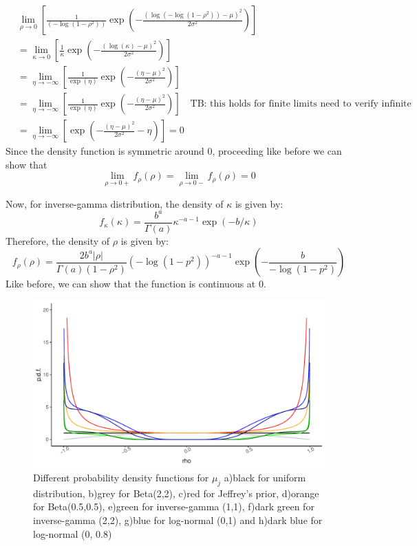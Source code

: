 \documentclass{amsart}
\begin{document}
\begin{align}
	&\lim_{\rho\to 0}\left[\frac{1}{(-\log(1-\rho^2))} 
	\exp\left(-\frac{(\log(-\log(1-\rho^2))-\mu)^2}{2\sigma^2}\right)\right]\\
	& = \lim_{\kappa\to 0}\left[\frac{1}{\kappa} 
	\exp\left(-\frac{(\log(\kappa)-\mu)^2}{2\sigma^2}\right)\right]\\
	& = \lim_{\eta\to -\infty}\left[\frac{1}{\exp(\eta)} 
	\exp\left(-\frac{(\eta-\mu)^2}{2\sigma^2}\right)\right]\\
	& = \lim_{\eta\to -\infty}\left[\frac{1}{\exp(\eta)} 
	\exp\left(-\frac{(\eta-\mu)^2}{2\sigma^2}\right)\right]\quad \text{TB: this holds for finite limits need to verify infinite}\\
	& = \lim_{\eta\to -\infty}\left[ 
	\exp\left(-\frac{(\eta-\mu)^2}{2\sigma^2}-\eta\right)\right] = 0
\end{align}
Since the density function is symmetric around 0, proceeding like before we can show that
\begin{equation}
	\lim_{\rho\to 0+}f_{\rho}(\rho) = \lim_{\rho\to 0-}f_{\rho}(\rho) = 0
\end{equation}

Now, for inverse-gamma distribution, the density of $\kappa$ is given by:
\begin{equation}
	f_{\kappa}(\kappa)= \frac{b^{a}}{\Gamma(a)}
	\kappa^{-a-1}\exp(-b/\kappa)
\end{equation}
Therefore, the density of $\rho$ is given by:
\begin{equation}
	f_{\rho}(\rho) = \frac{2b^{a}|\rho|}{\Gamma(a)(1-\rho^2)}
	(-\log(1-p^2))^{-a-1}\exp\left(-\frac{b}{-\log(1-p^2)}\right)
\end{equation}
Like before, we can show that the function is continuous at 0.

\begin{figure}[ht]
	\centering
	\includegraphics[width=0.85\linewidth]{prior_comparison.pdf}
	\caption{Different probability density functions for $\mu_j$ a)black for uniform distribution,
	b)grey for Beta(2,2),
	c)red for Jeffrey's prior,
	d)orange for Beta(0.5,0.5),
	e)green for inverse-gamma (1,1),
	f)dark green for inverse-gamma (2,2),
	g)blue for log-normal (0,1) and
	h)dark blue for log-normal (0, 0.8)}
	\label{fig:sim-prior}
\end{figure}
\fi
\end{document}
